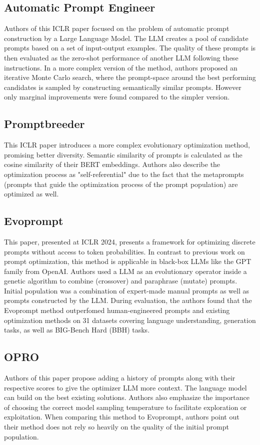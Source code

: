 \subsection{Automatic Prompt Engineer \cite{zhou2023largelanguagemodelshumanlevel}}
Authors of this ICLR paper focused on the problem of automatic prompt construction by a Large Language Model. The LLM creates a pool of candidate prompts based on a set of input-output examples.
The quality of these prompts is then evaluated as the zero-shot performance of another LLM following these instructions. In a more complex version of the method, authors proposed an iterative Monte Carlo search, where the prompt-space around 
the best performing candidates is sampled by constructing semantically similar prompts. However only marginal improvements were found compared to the simpler version. 
\subsection{Promptbreeder \cite{fernando2023promptbreederselfreferentialselfimprovementprompt}}
This ICLR paper introduces a more complex evolutionary optimization method, promising better diversity. Semantic similarity of prompts is calculated as the cosine similarity of their BERT embeddings.
Authors also describe the optimization process as "self-referential" due to the fact that the metaprompts (prompts that guide the optimization process of the prompt population) are optimized as well.
\subsection{Evoprompt \cite{guo2024connectinglargelanguagemodels}}
This paper, presented at ICLR 2024, presents a framework for optimizing discrete prompts without access to token probabilities. 
In contrast to previous work on prompt optimization, this method is applicable in black-box LLMs like the GPT family from OpenAI.
Authors used a LLM as an evolutionary operator inside a genetic algorithm to combine (crossover) and paraphrase (mutate) prompts. 
Initial population was a combination of expert-made manual prompts as well as prompts constructed by the LLM.
During evaluation, the authors found that the Evoprompt method outperfomed human-engineered prompts and existing optimization methods on 31 datasets covering language understanding, generation tasks, as well as BIG-Bench Hard (BBH) tasks.
\subsection{OPRO \cite{yang2024largelanguagemodelsoptimizers}}
Authors of this paper propose adding a history of prompts along with their respective scores to give the optimizer LLM more context.
The language model can build on the best existing solutions. Authors also emphasize the importance of choosing the correct model sampling temperature to facilitate exploration or exploitation.
When comparing this method to Evoprompt, authors point out their method does not rely so heavily on the quality of the initial prompt population.
